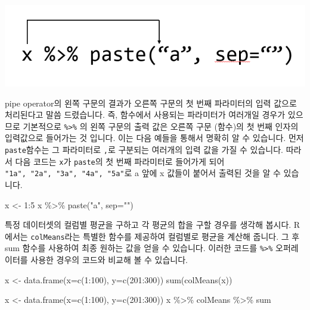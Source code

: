 \documentclass[
]{book}
\newenvironment{Shaded}{\begin{snugshade}}{\end{snugshade}}
\newcommand{\AttributeTok}[1]{\textcolor[rgb]{0.77,0.63,0.00}{#1}}
\newcommand{\DecValTok}[1]{\textcolor[rgb]{0.00,0.00,0.81}{#1}}
\newcommand{\FunctionTok}[1]{\textcolor[rgb]{0.00,0.00,0.00}{#1}}
\newcommand{\NormalTok}[1]{#1}
\newcommand{\OtherTok}[1]{\textcolor[rgb]{0.56,0.35,0.01}{#1}}
\newcommand{\SpecialCharTok}[1]{\textcolor[rgb]{0.00,0.00,0.00}{#1}}
\newcommand{\StringTok}[1]{\textcolor[rgb]{0.31,0.60,0.02}{#1}}
\begin{document}
\includegraphics{images/07/02.PNG}

pipe operator의 왼쪽 구문의 결과가 오른쪽 구문의 첫 번째 파라미터의 입력 값으로 처리된다고 말씀 드렸습니다. 즉, 함수에서 사용되는 파라미터가 여러개일 경우가 있으므로 기본적으로 \texttt{\%\textgreater{}\%} 의 왼쪽 구문의 출력 값은 오른쪽 구문 (함수)의 첫 번째 인자의 입력값으로 들어가는 것 입니다. 이는 다음 예들을 통해서 명확히 알 수 있습니다. 먼저 \texttt{paste}함수는 그 파라미터로 \texttt{,}로 구분되는 여러개의 입력 값을 가질 수 있습니다. 따라서 다음 코드는 \texttt{x}가 \texttt{paste}의 첫 번째 파라미터로 들어가게 되어 \texttt{"1a",\ "2a",\ "3a",\ "4a",\ "5a"}로 a 앞에 x 값들이 붙어서 출력된 것을 알 수 있습니다.

\begin{Shaded}
\begin{Highlighting}[]
\NormalTok{x }\OtherTok{\textless{}{-}} \DecValTok{1}\SpecialCharTok{:}\DecValTok{5}
\NormalTok{x }\SpecialCharTok{\%\textgreater{}\%} \FunctionTok{paste}\NormalTok{(}\StringTok{"a"}\NormalTok{, }\AttributeTok{sep=}\StringTok{""}\NormalTok{)}
\end{Highlighting}
\end{Shaded}

특정 데이터셋의 컬럼별 평균을 구하고 각 평균의 합을 구할 경우를 생각해 봅시다. R에서는 \texttt{colMeans}라는 특별한 함수를 제공하여 컬럼별로 평균을 계산해 줍니다. 그 후 sum 함수를 사용하여 최종 원하는 값을 얻을 수 있습니다. 이러한 코드를 \texttt{\%\textgreater{}\%} 오퍼레이터를 사용한 경우의 코드와 비교해 볼 수 있습니다.

\begin{Shaded}
\begin{Highlighting}[]
\NormalTok{x }\OtherTok{\textless{}{-}} \FunctionTok{data.frame}\NormalTok{(}\AttributeTok{x=}\FunctionTok{c}\NormalTok{(}\DecValTok{1}\SpecialCharTok{:}\DecValTok{100}\NormalTok{), }\AttributeTok{y=}\FunctionTok{c}\NormalTok{(}\DecValTok{201}\SpecialCharTok{:}\DecValTok{300}\NormalTok{))}
\FunctionTok{sum}\NormalTok{(}\FunctionTok{colMeans}\NormalTok{(x))}

\NormalTok{x }\OtherTok{\textless{}{-}} \FunctionTok{data.frame}\NormalTok{(}\AttributeTok{x=}\FunctionTok{c}\NormalTok{(}\DecValTok{1}\SpecialCharTok{:}\DecValTok{100}\NormalTok{), }\AttributeTok{y=}\FunctionTok{c}\NormalTok{(}\DecValTok{201}\SpecialCharTok{:}\DecValTok{300}\NormalTok{))}
\NormalTok{x }\SpecialCharTok{\%\textgreater{}\%}\NormalTok{ colMeans }\SpecialCharTok{\%\textgreater{}\%}\NormalTok{ sum}
\end{Highlighting}
\end{Shaded}
\end{document}
